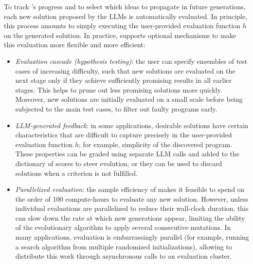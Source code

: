 To track \method's progress and to select which ideas to propagate in future generations, each new solution proposed by the LLMs is automatically evaluated.
In principle, this process amounts to simply executing the user-provided evaluation function $h$ on the generated solution.
In practice, \method supports optional mechanisms to make this evaluation more flexible and more efficient:
\begin{itemize}
\item
\emph{Evaluation cascade (hypothesis testing)}: the user can specify ensembles of test cases of increasing difficulty, such that new solutions are  evaluated on the next stage only if they achieve sufficiently promising results in all earlier stages.
This helps to prune out less promising solutions more quickly. Moreover, new solutions are initially evaluated on a small scale before being subjected to the main test cases, to filter out faulty programs early.
\item
\emph{LLM-generated feedback}: in some applications, desirable solutions have certain characteristics that are difficult to capture precisely in the user-provided evaluation function $h$; for example, simplicity of the discovered program.
These properties can be graded using separate LLM calls and added to the dictionary of scores to steer evolution, or they can be used to discard solutions when a criterion is not fulfilled.
\item
\emph{Parallelized evaluation}: the sample efficiency of \method makes it feasible to spend on the order of 100 compute-hours to evaluate any new solution.
However, unless individual evaluations are parallelized to reduce their wall-clock duration, this can slow down the rate at which new generations appear, limiting the ability of the evolutionary algorithm to apply several consecutive mutations.
In many applications, evaluation is embarrassingly parallel (for example, running a search algorithm from multiple randomized initializations), allowing \method to distribute this work through asynchronous calls to an evaluation cluster.
\end{itemize}

